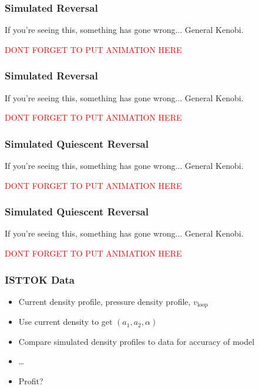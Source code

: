 \documentclass{beamer}
\begin{document}
\begin{frame}
\frametitle{Simulated Reversal}

If you're seeing this, something has gone wrong... General Kenobi.

\textcolor{red}{DONT FORGET TO PUT ANIMATION HERE}

\end{frame}

\begin{frame}
\frametitle{Simulated Reversal}

If you're seeing this, something has gone wrong... General Kenobi.

\textcolor{red}{DONT FORGET TO PUT ANIMATION HERE}

\end{frame}

\begin{frame}
\frametitle{Simulated Quiescent Reversal}

If you're seeing this, something has gone wrong... General Kenobi.

\textcolor{red}{DONT FORGET TO PUT ANIMATION HERE}

\end{frame}

\begin{frame}
\frametitle{Simulated Quiescent Reversal}

If you're seeing this, something has gone wrong... General Kenobi.

\textcolor{red}{DONT FORGET TO PUT ANIMATION HERE}

\end{frame}
    








\begin{frame}
\frametitle{ISTTOK Data}
\begin{itemize}
    \item Current density profile, pressure density profile, $v_{\text{loop}}$
    \item Use current density to get $(a_1, a_2, \alpha)$
    \item Compare simulated density profiles to data for accuracy of model
    \item \dots 
    \item Profit?
\end{itemize}
\end{frame}
\end{document}
